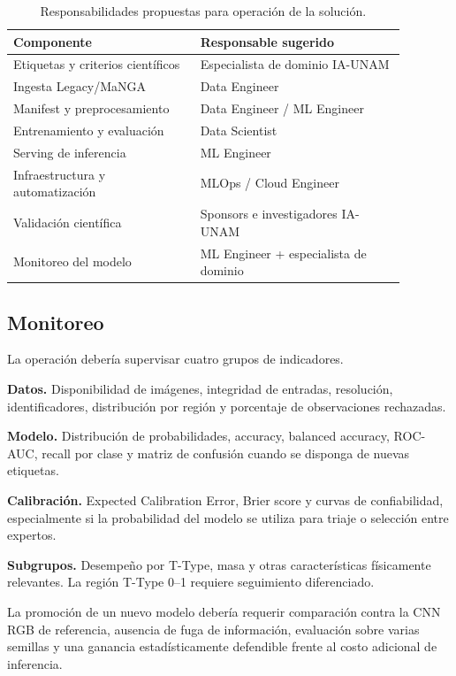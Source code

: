 \documentclass[letterpaper,11pt]{article}
\begin{document}
\begin{table}[H] 
  \centering 
  \caption{Responsabilidades propuestas para operación de la solución.} 
  \label{tab:responsables}

  \begin{tabular}{p{0.42\linewidth}p{0.46\linewidth}} 
    \toprule Componente & Responsable sugerido\\ 
    \midrule Etiquetas y criterios científicos & Especialista de dominio IA-UNAM\\
    Ingesta Legacy/MaNGA & Data Engineer\\ 
    Manifest y preprocesamiento & Data Engineer / ML Engineer\\ 
    Entrenamiento y evaluación & Data Scientist\\ 
    Serving de inferencia & ML Engineer\\ 
    Infraestructura y automatización & MLOps / Cloud Engineer\\ 
    Validación científica & Sponsors e investigadores IA-UNAM\\
    Monitoreo del modelo & ML Engineer + especialista de dominio\\ 
    \bottomrule 
  \end{tabular} 
\end{table} 

\subsection{Monitoreo}

La operación debería supervisar cuatro grupos de indicadores.

\textbf{Datos.} 
Disponibilidad de imágenes, integridad de entradas, resolución, identificadores, distribución por región y porcentaje de observaciones rechazadas. 

\textbf{Modelo.} 
Distribución de probabilidades, accuracy, balanced accuracy, ROC-AUC, recall por clase y matriz de confusión cuando se disponga de nuevas etiquetas. 

\textbf{Calibración.} 
Expected Calibration Error, Brier score y curvas de confiabilidad, especialmente si la probabilidad del modelo se utiliza para triaje o selección entre expertos. 

\textbf{Subgrupos.} 
Desempeño por T-Type, masa y otras características físicamente relevantes. La región T-Type 0--1 requiere seguimiento diferenciado.

La promoción de un nuevo modelo debería requerir comparación contra la CNN RGB de referencia, ausencia de fuga de información, evaluación sobre varias semillas y una ganancia estadísticamente defendible frente al costo adicional de inferencia.
\end{document}
